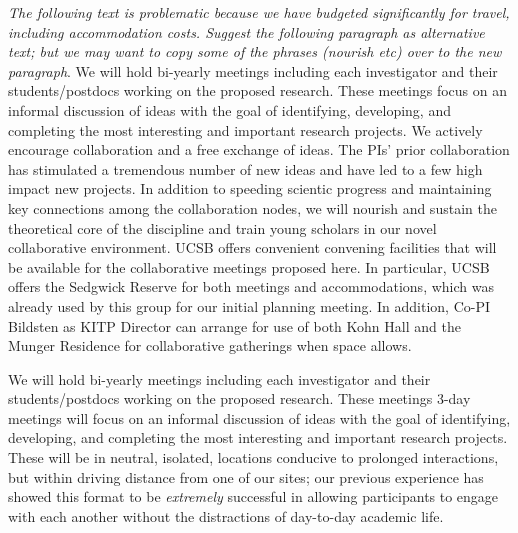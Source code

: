 \emph{The following text is problematic because we have budgeted significantly for travel, including accommodation costs. Suggest the following paragraph as alternative text; but we may want to copy some of the phrases (nourish etc) over to the new paragraph}. We will hold bi-yearly meetings including each investigator and their students/postdocs working on the proposed research. These meetings focus on an informal discussion of ideas with the goal of identifying, developing, and completing the most interesting and important research projects. We actively encourage collaboration and a free exchange of ideas. The PIs' prior collaboration has stimulated a tremendous number of new ideas and have led to a few high impact new projects. In addition to speeding scientic progress and maintaining key connections among the collaboration nodes, we will nourish and sustain the theoretical core of the discipline and train young scholars in our novel collaborative environment. UCSB offers convenient convening facilities that will be available for the collaborative meetings proposed here. In particular, UCSB offers the Sedgwick Reserve for both meetings and accommodations, which was already used by this group for our initial planning meeting. In addition, Co-PI Bildsten as KITP Director can arrange for use of both Kohn Hall and the Munger Residence for collaborative gatherings when space allows.

We will hold bi-yearly meetings including each investigator and their students/postdocs working on the proposed research. These meetings 3-day meetings will focus on an informal discussion of ideas with the goal of identifying, developing, and completing the most interesting and important research projects. These will be in neutral, isolated, locations conducive to prolonged interactions, but within driving distance from one of our sites; our previous experience has showed this format to be \emph{extremely} successful in allowing participants to engage with each another without the distractions of day-to-day academic life. 
